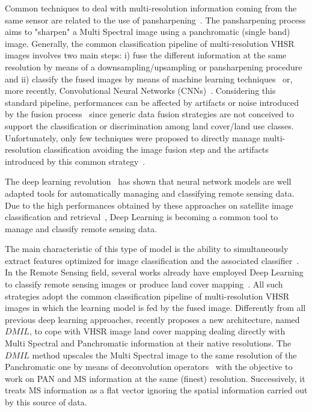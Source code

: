 \documentclass[journal]{IEEEtran}
\begin{document}
Common techniques to deal with multi-resolution information coming from the same sensor are related to the use of pansharpening~\cite{4505280,Colditz06}. The pansharpening process aims to "sharpen" a Multi Spectral image using a panchromatic (single band) image. Generally, the common classification pipeline of multi-resolution VHSR images involves two main steps: i) fuse the different information at the same resolution by means of a downsampling/upsampling or pansharpening procedure~\cite{Colditz06} and ii) classify the fused images by means of machine learning techniques~\cite{RegniersBLG16} or, more recently, Convolutional Neural Networks (CNNs)~\cite{MaggioriTCA17,VolpiT17}.
Considering this standard pipeline, performances can be affected by artifacts or noise introduced by the fusion process~\cite{Colditz06} since generic data fusion strategies are not conceived to support the classification or discrimination among land cover/land use classes. Unfortunately, only few techniques were proposed to directly manage multi-resolution classification avoiding the image fusion step and the artifacts introduced by this common strategy~\cite{WemmertPFG09,StorvikFS05,LiuJZZZLYT18}. 

The deep learning revolution~\cite{Zhang16} has shown that neural network models are well adapted tools for automatically managing and classifying remote sensing data. Due to the high performances obtained by these approaches on satellite image classification and retrieval~\cite{DLiuWZZHF18,GuoYZH18,LiZHZM18}, Deep Learning is becoming a common tool to manage and classify remote sensing data.

The main characteristic of this type of model is the ability to simultaneously extract features optimized for image classification and the associated classifier~\cite{BengioCV13}. In the Remote Sensing field, several works already have employed Deep Learning to classify remote sensing images or produce land cover mapping~\cite{DLiuWZZHF18,GuoYZH18,TianLXM18,ScottESMD17}. All such strategies adopt the common classification pipeline of multi-resolution VHSR images in which the learning model is fed by the fused image.
Differently from all previous deep learning approaches, \cite{LiuJZZZLYT18} recently proposes a new architecture, named $DMIL$, to cope with VHSR image land cover mapping dealing directly with Multi Spectral and Panchromatic information at their native resolutions. The $DMIL$ method upscales the Multi Spectral image to the same resolution of the Panchromatic one by means of deconvolution operators~\cite{VolpiT17,AudebertSL16,NohHH15} with the objective to work on PAN and MS information at the same (finest) resolution. Successively, it treats MS information as a flat vector ignoring the spatial information carried out by this source of data. 
\end{document}
